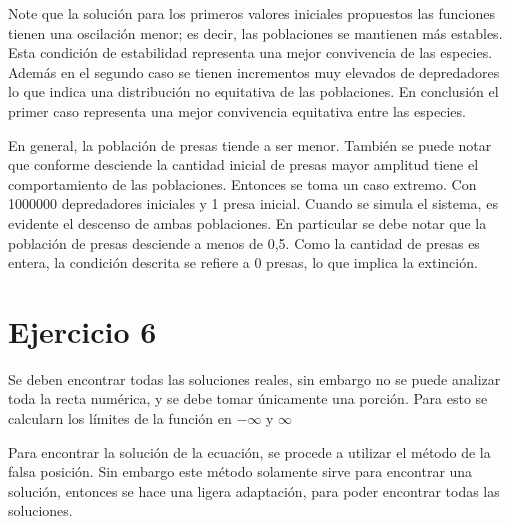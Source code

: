 \documentclass {article}
\begin{document}
Note que la solución para los primeros valores iniciales propuestos las funciones tienen una oscilación menor; es decir, las poblaciones se mantienen más estables. Esta condición de estabilidad representa una mejor convivencia de las especies. Además en el segundo caso se tienen incrementos muy elevados de depredadores lo que indica una distribución no equitativa de las poblaciones. En conclusión el primer caso representa una mejor convivencia equitativa entre las especies.

En general, la población de presas tiende a ser menor. También se puede notar que conforme desciende la cantidad inicial de presas mayor amplitud tiene el comportamiento de las poblaciones. Entonces se toma un caso extremo. Con 1000000 depredadores iniciales y 1 presa inicial. Cuando se simula el sistema, es evidente el descenso de ambas poblaciones. En particular se debe notar que la población de presas desciende a menos de 0,5. Como la cantidad de presas es entera, la condición descrita se refiere a 0 presas, lo que implica la extinción. 

\section{Ejercicio 6}

Se deben encontrar todas las soluciones reales, sin embargo no se puede analizar toda la recta numérica, y se debe tomar únicamente una porción. Para esto se calcularn los límites de la función en $-\infty$ y $\infty$

Para encontrar la solución de la ecuación, se procede a utilizar el método de la falsa posición. Sin embargo este método solamente sirve para encontrar una solución, entonces se hace una ligera adaptación, para poder encontrar todas las soluciones. 
\end{document}
